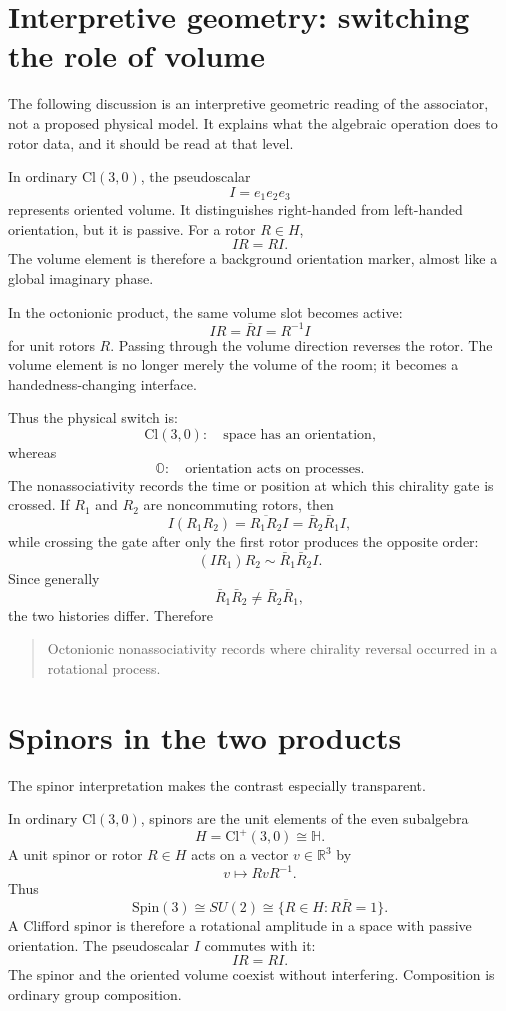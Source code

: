 \documentclass[11pt]{article}
\newcommand{\Cl}{\mathrm{Cl}}
\newcommand{\OO}{\mathbb O}
\begin{document}
\section{Interpretive geometry: switching the role of volume}

The following discussion is an interpretive geometric reading of the associator, not a proposed physical model. It explains what the algebraic operation does to rotor data, and it should be read at that level.

In ordinary $\Cl(3,0)$, the pseudoscalar
\[
I=e_1e_2e_3
\]
represents oriented volume. It distinguishes right-handed from left-handed
orientation, but it is passive. For a rotor $R\in H$,
\[
IR=RI.
\]
The volume element is therefore a background orientation marker, almost like a
global imaginary phase.

In the octonionic product, the same volume slot becomes active:
\[
IR=\bar R I=R^{-1}I
\]
for unit rotors $R$. Passing through the volume direction reverses the rotor.
The volume element is no longer merely the volume of the room; it becomes a
handedness-changing interface.

Thus the physical switch is:
\[
\Cl(3,0):\quad \text{space has an orientation,}
\]
whereas
\[
\OO:\quad \text{orientation acts on processes.}
\]
The nonassociativity records the time or position at which this chirality gate
is crossed. If $R_1$ and $R_2$ are noncommuting rotors, then
\[
I(R_1R_2)=\overline{R_1R_2}I=\bar R_2\bar R_1 I,
\]
while crossing the gate after only the first rotor produces the opposite order:
\[
(IR_1)R_2\sim \bar R_1\bar R_2 I.
\]
Since generally
\[
\bar R_1\bar R_2\neq \bar R_2\bar R_1,
\]
the two histories differ. Therefore
\begin{quote}
Octonionic nonassociativity records where chirality reversal occurred in a
rotational process.
\end{quote}

\section{Spinors in the two products}

The spinor interpretation makes the contrast especially transparent.

In ordinary $\Cl(3,0)$, spinors are the unit elements of the even subalgebra
\[
H=\Cl^+(3,0)\cong\mathbb H.
\]
A unit spinor or rotor $R\in H$ acts on a vector $v\in\mathbb R^3$ by
\[
v\mapsto RvR^{-1}.
\]
Thus
\[
\mathrm{Spin}(3)\cong SU(2)\cong \{R\in H:R\bar R=1\}.
\]
A Clifford spinor is therefore a rotational amplitude in a space with passive
orientation. The pseudoscalar $I$ commutes with it:
\[
IR=RI.
\]
The spinor and the oriented volume coexist without interfering. Composition is
ordinary group composition.
\end{document}

